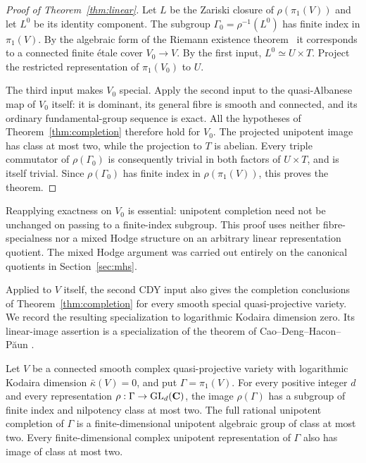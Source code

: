 \begin{proof}[Proof of Theorem~\ref{thm:linear}]
Let $L$ be the Zariski closure of $\rho(\pi_1(V))$ and let $L^0$ be its
identity component. The subgroup $\Gamma_0=\rho^{-1}(L^0)$ has finite
index in $\pi_1(V)$. By the algebraic form of the Riemann existence
theorem~\cite[Expos\'e~XII, Th\'eor\`eme~5.1, p.~251]{SGA1}
it corresponds to a connected finite \'etale cover $V_0\to V$.
By the first input, $L^0\simeq U\times T$. Project the restricted
representation of $\pi_1(V_0)$ to $U$.

The third input makes $V_0$ special. Apply the second input to the
quasi-Albanese map of $V_0$ itself: it is dominant, its general fibre
is smooth and connected, and its ordinary fundamental-group sequence
is exact. All the hypotheses of Theorem~\ref{thm:completion} therefore
hold for $V_0$. The projected unipotent image has class at most two,
while the projection to $T$ is abelian. Every triple commutator of
$\rho(\Gamma_0)$ is consequently trivial in both factors of
$U\times T$, and is itself trivial. Since $\rho(\Gamma_0)$ has finite
index in $\rho(\pi_1(V))$, this proves the theorem.
\end{proof}

Reapplying exactness on $V_0$ is essential: unipotent completion need
not be unchanged on passing to a finite-index subgroup. This proof
uses neither fibre-specialness nor a mixed Hodge structure on an
arbitrary linear representation quotient. The mixed Hodge argument
was carried out entirely on the canonical quotients in
Section~\ref{sec:mhs}.

Applied to $V$ itself, the second CDY input also gives the completion
conclusions of Theorem~\ref{thm:completion} for every smooth special
quasi-projective variety. We record the resulting specialization to logarithmic Kodaira
dimension zero. Its linear-image assertion is a specialization of the
theorem of Cao--Deng--Hacon--P\u aun \cite[Theorem A]{CDHP2026}.

\begin{corollary}\label{cor:log-kodaira-zero}
Let $V$ be a connected smooth complex quasi-projective variety with
logarithmic Kodaira dimension $\bar\kappa(V)=0$, and put
$\Gamma=\pi_1(V)$. For every positive integer $d$ and every
representation $\rho:\Gamma\to\operatorname{GL}_d(\mathbf C)$, the image $\rho(\Gamma)$ has
a subgroup of finite index and nilpotency class at most two. The full
rational unipotent completion of $\Gamma$ is a finite-dimensional
unipotent algebraic group of class at most two. Every finite-dimensional
complex unipotent representation of $\Gamma$ also has image of class
at most two.
\end{corollary}


